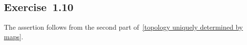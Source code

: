 \subsection{Exercise~1.10}

The assertion follows from the second part of~\cref{topology uniquely determined by maps}.
